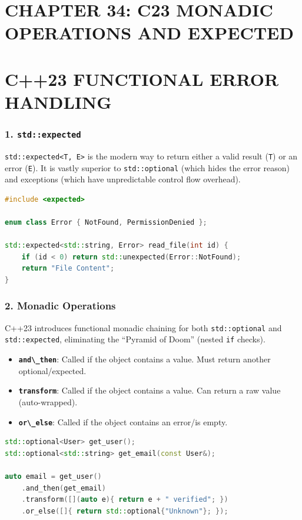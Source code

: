 \hypertarget{chapter-34-c23-monadic-operations-and-expected}{%
\section{CHAPTER 34: C23 MONADIC OPERATIONS AND
EXPECTED}\label{chapter-34-c23-monadic-operations-and-expected}}

\hypertarget{c23-functional-error-handling}{%
\section{C++23 FUNCTIONAL ERROR
HANDLING}\label{c23-functional-error-handling}}

\hypertarget{stdexpected}{%
\subsubsection{\texorpdfstring{1.
\texttt{std::expected}}{1. std::expected}}\label{stdexpected}}

\passthrough{\lstinline!std::expected<T, E>!} is the modern way to
return either a valid result (\passthrough{\lstinline!T!}) or an error
(\passthrough{\lstinline!E!}). It is vastly superior to
\passthrough{\lstinline!std::optional!} (which hides the error reason)
and exceptions (which have unpredictable control flow overhead).

\begin{lstlisting}[language={C++}]
#include <expected>

enum class Error { NotFound, PermissionDenied };

std::expected<std::string, Error> read_file(int id) {
    if (id < 0) return std::unexpected(Error::NotFound);
    return "File Content";
}
\end{lstlisting}

\hypertarget{monadic-operations}{%
\subsubsection{2. Monadic Operations}\label{monadic-operations}}

C++23 introduces functional monadic chaining for both
\passthrough{\lstinline!std::optional!} and
\passthrough{\lstinline!std::expected!}, eliminating the ``Pyramid of
Doom'' (nested \passthrough{\lstinline!if!} checks).

\begin{itemize}
\tightlist
\item
  \textbf{\passthrough{\lstinline!and\_then!}}: Called if the object
  contains a value. Must return another optional/expected.
\item
  \textbf{\passthrough{\lstinline!transform!}}: Called if the object
  contains a value. Can return a raw value (auto-wrapped).
\item
  \textbf{\passthrough{\lstinline!or\_else!}}: Called if the object
  contains an error/is empty.
\end{itemize}

\begin{lstlisting}[language={C++}]
std::optional<User> get_user();
std::optional<std::string> get_email(const User&);

auto email = get_user()
    .and_then(get_email)
    .transform([](auto e){ return e + " verified"; })
    .or_else([]{ return std::optional{"Unknown"}; });
\end{lstlisting}
